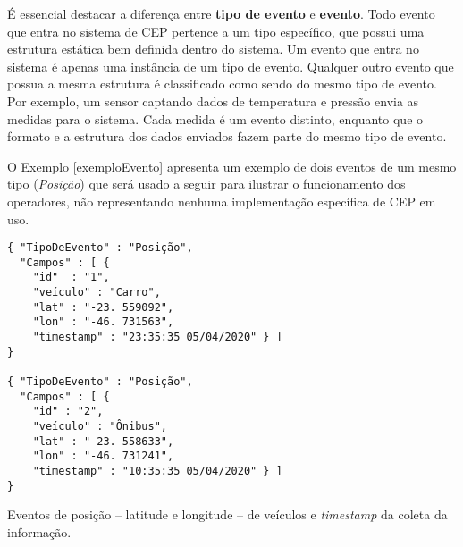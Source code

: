 % 
É essencial destacar a diferença entre \textbf{tipo de evento} e \textbf{evento}. Todo evento que entra no sistema de CEP pertence a um tipo específico, que possui uma estrutura estática bem definida dentro do sistema. Um evento que entra no sistema é apenas uma instância de um tipo de evento. Qualquer outro evento que possua a mesma estrutura é classificado como sendo do mesmo tipo de evento. Por exemplo, um sensor captando dados de temperatura e pressão envia as medidas para o sistema. Cada medida é um evento distinto, enquanto que o formato e a estrutura dos dados enviados fazem parte do mesmo tipo de evento. %

O Exemplo \ref{exemploEvento} apresenta um exemplo de dois eventos de um mesmo tipo (\textit{Posição}) que será usado a seguir para ilustrar o funcionamento dos operadores, não representando nenhuma implementação específica de CEP em uso.







\begin{evento}[t]

\begin{verbatim} 
{ "TipoDeEvento" : "Posição",
  "Campos" : [ {
    "id"  : "1",
    "veículo" : "Carro",
    "lat" : "-23. 559092",
    "lon" : "-46. 731563",
    "timestamp" : "23:35:35 05/04/2020" } ]
}

{ "TipoDeEvento" : "Posição",
  "Campos" : [ {
    "id" : "2",
    "veículo" : "Ônibus",
    "lat" : "-23. 558633",
    "lon" : "-46. 731241",
    "timestamp" : "10:35:35 05/04/2020" } ]
}
\end{verbatim}
\caption{Eventos de posição -- latitude e longitude -- de veículos e \textit{timestamp} da coleta da informação.}
\label{exemploEvento}
\end{evento}


